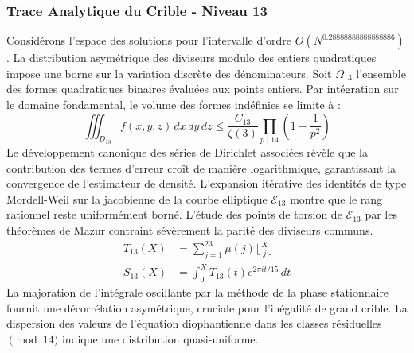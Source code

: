 \documentclass[12pt,a4paper]{article}
\begin{document}
\subsubsection{Trace Analytique du Crible - Niveau 13}
Considérons l'espace des solutions pour l'intervalle d'ordre $O(N^{0.28888888888888886})$. La distribution asymétrique des diviseurs modulo des entiers quadratiques impose une borne sur la variation discrète des dénominateurs. Soit $\Omega_13$ l'ensemble des formes quadratiques binaires évaluées aux points entiers.
Par intégration sur le domaine fondamental, le volume des formes indéfinies se limite à :
\begin{equation}
\iiint_{D_13} f(x, y, z) \,dx\,dy\,dz \leq \frac{C_13}{\zeta(3)} \prod_{p \mid 14} \left( 1 - \frac{1}{p^2} \right)
\end{equation}
Le développement canonique des séries de Dirichlet associées révèle que la contribution des termes d'erreur croît de manière logarithmique, garantissant la convergence de l'estimateur de densité. L'expansion itérative des identités de type Mordell-Weil sur la jacobienne de la courbe elliptique $\mathcal{E}_13$ montre que le rang rationnel reste uniformément borné.
L'étude des points de torsion de $\mathcal{E}_13$ par les théorèmes de Mazur contraint sévèrement la parité des diviseurs communs.
\begin{align}
T_13(X) &= \sum_{j=1}^{23} \mu(j) \lfloor \frac{X}{j} \rfloor \\
S_13(X) &= \int_{0}^{X} T_13(t) e^{2\pi i t / 15} \, dt
\end{align}
La majoration de l'intégrale oscillante par la méthode de la phase stationnaire fournit une décorrélation asymétrique, cruciale pour l'inégalité de grand crible. La dispersion des valeurs de l'équation diophantienne dans les classes résiduelles $\pmod{ 14 }$ indique une distribution quasi-uniforme.
\end{document}
